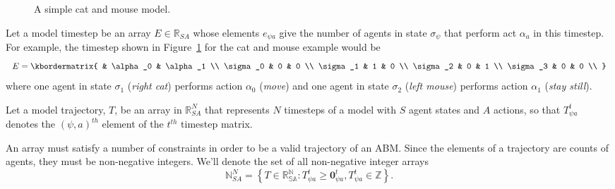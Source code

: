 \documentclass{article}
\begin{document}
\begin{figure}
	\centering
	\caption{A simple cat and mouse model.\label{fig:AB-MCMC-1}}
\end{figure}


Let a model timestep be an array $E \in \mathbb{R}_{SA}$ whose elements $e_{\psi a}$ give the number of agents in state $\sigma_\psi$ that perform act $\alpha_a$ in this timestep. For example, the timestep shown in Figure~\ref{fig:AB-MCMC-1} for the cat and mouse example would be
\[
E = \kbordermatrix{
	& \alpha_0 & \alpha_1 \\
	\sigma_0 & 0 & 0 \\
	\sigma_1 & 1 & 0 \\
	\sigma_2 & 0  & 1 \\
	\sigma_3 & 0 & 0 \\
}
\]
where one agent in state $\sigma_1$ (\textit{right cat}) performs action $\alpha_0$ (\textit{move}) and one agent in state $\sigma_2$ (\textit{left mouse}) performs action $\alpha_1$ (\textit{stay still}).

Let a model trajectory, $T$, be an array in $\mathbb{R}^N_{SA}$ that represents $N$ timesteps of a model with $S$ agent states and $A$ actions, so that $T^t_{\psi a}$ denotes the $(\psi, a)^{th}$ element of the $t^{th}$ timestep matrix.

An array must satisfy a number of constraints in order to be a valid trajectory of an ABM. Since the elements of a trajectory are counts of agents, they must be non-negative integers. We'll denote the set of all non-negative integer arrays
\begin{equation}
\mathbb{N}^N_{SA} = \left\{ T \in \mathbb{R^N_{SA}}: T^t_{\psi a} \ge \mathbf{0}^t_{\psi a}, T^t_{\psi a} \in \mathbb{Z}\right\}.
\label{nonNegativeInt}
\end{equation}
\end{document}

